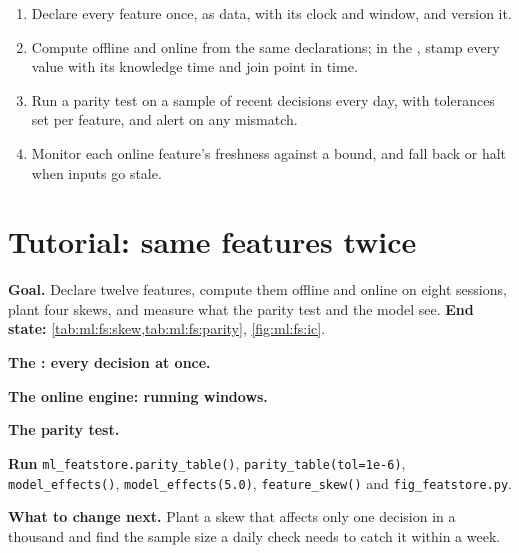 \begin{method}\label{met:ml:fs:method}
\begin{enumerate}
\item Declare every feature once, as data, with its clock and window, and version it.
\item Compute offline and online from the same declarations; in the , stamp every value with its knowledge time
and join point in time.
\item Run a parity test on a sample of recent decisions every day, with tolerances set per feature, and alert on any mismatch.
\item Monitor each online feature's freshness against a bound, and fall back or halt when inputs go stale.
\end{enumerate}
\end{method}

\section{Tutorial: same features twice}\label{tut:ml:data-and-feature-stores:tut}

\begin{tutorial}
\textbf{Goal.} Declare twelve features, compute them offline and online on eight sessions, plant four skews, and measure what
the parity test and the model see. \textbf{End state:} \cref{tab:ml:fs:skew,tab:ml:fs:parity}, \cref{fig:ml:fs:ic}.
\begin{tutsteps}
\item \textbf{The : every decision at once.}
\label{lst:ml:fs:offline}
\item \textbf{The online engine: running windows.}
\label{lst:ml:fs:online}
\item \textbf{The parity test.}
\label{lst:ml:fs:parity}
\item \textbf{Run} \texttt{ml\_featstore.parity\_table()}, \texttt{parity\_table(tol=1e-6)}, \texttt{model\_effects()},
\texttt{model\_effects(5.0)}, \texttt{feature\_skew()} and \texttt{fig\_featstore.py}.
\end{tutsteps}
\textbf{What to change next.} Plant a skew that affects only one decision in a thousand and find the sample size a daily check
needs to catch it within a week.
\end{tutorial}

